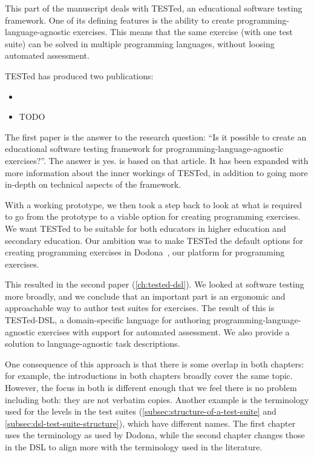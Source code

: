 \documentclass[./main]{subfiles}
\begin{document}
This part of the manuscript deals with TESTed, an educational software testing framework.
One of its defining features is the ability to create programming-language-agnostic exercises.
This means that the same exercise (with one test suite) can be solved in multiple programming languages, without loosing automated assessment.

TESTed has produced two publications:

\begin{itemize}
    \item {}
    \item TODO
\end{itemize}

The first paper is the answer to the research question: ``Is it possible to create an educational software testing framework for programming-language-agnostic exercises?''.
The answer is yes.
 is based on that article.
It has been expanded with more information about the inner workings of TESTed, in addition to going more in-depth on technical aspects of the framework.

With a working prototype, we then took a step back to look at what is required to go from the prototype to a viable option for creating programming exercises.
We want TESTed to be suitable for both educators in higher education and secondary education.
Our ambition was to make TESTed the default options for creating programming exercises in Dodona~\autocite{vanpetegemDodonaLearnCode2023}, our platform for programming exercises.

This resulted in the second paper (\cref{ch:tested-dsl}).
We looked at software testing more broadly, and we conclude that an important part is an ergonomic and approachable way to author test suites for exercises.
The result of this is TESTed-DSL, a domain-specific language for authoring programming-language-agnostic exercises with support for automated assessment.
We also provide a solution to language-agnostic task descriptions.

One consequence of this approach is that there is some overlap in both chapters: for example, the introductions in both chapters broadly cover the same topic.
However, the focus in both is different enough that we feel there is no problem including both: they are not verbatim copies.
Another example is the terminology used for the levels in the test suites (\vref{subsec:structure-of-a-test-suite} and \vref{subsec:dsl-test-suite-structure}), which have different names.
The first chapter uses the terminology as used by Dodona, while the second chapter changes those in the DSL to align more with the terminology used in the literature.
\end{document}
